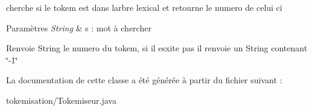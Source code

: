cherche si le tokem est dans l\textquotesingle{}arbre lexical et retourne le numero de celui ci 


\begin{DoxyParams}{Paramètres}
{\em String} & s \+: mot à chercher \\
\hline
\end{DoxyParams}
\begin{DoxyReturn}{Renvoie}
String le numero du tokem, si il esxite pas il renvoie un String contenant \char`\"{}-\/1\char`\"{} 
\end{DoxyReturn}


La documentation de cette classe a été générée à partir du fichier suivant \+:\begin{DoxyCompactItemize}
\item 
tokemisation/Tokemiseur.\+java\end{DoxyCompactItemize}
